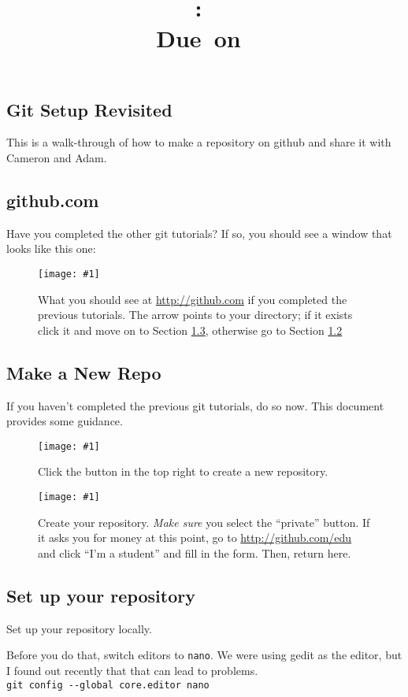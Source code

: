 \documentclass{article}
\title{\vspace{2in}\textmd{\textbf{\hmwkClass:\ \hmwkTitle}}\\\normalsize\vspace{0.1in}\small{Due\ on\ \hmwkDueDate}\\\vspace{0.1in}\large{}\vspace{3in}}
\date{}
\def\Figure#1#2#3#4#5{
\begin{figure}[htp]
\texttt{[image: \#1]}
\caption{#2}
\label{#3}
\end{figure}
}
\begin{document}
\begin{spacing}{0.5}
\newpage



\section{Git Setup Revisited}

This is a walk-through of how to make a repository on github and share
it with Cameron and Adam.

\subsection{github.com}
Have you completed the other git tutorials?  If so, you should see
a window that looks like this one:

\Figure{Frame1_yourdir.png}
{What you should see at \url{http://github.com} if you completed
the previous tutorials.  The arrow points to your directory;
if it exists click it and move on to Section \ref{sec:setup}, otherwise
go to Section \ref{sec:makenew}}
{fig:yourdir}{0.5}{0}

\clearpage
\subsection{Make a New Repo}
\label{sec:makenew}
If you haven't completed the previous git tutorials, do so now.
This document provides some guidance.

\Figure{MakeNewRepo.png}
{Click the button in the top right to create a new repository.}
{fig:makenew}{0.5}{0}

\Figure{CreateRepository.png}
{Create your repository. \emph{Make sure} you select the ``private'' button.
If it asks you for money at this point, go to \url{http://github.com/edu}
and click ``I'm a student'' and fill in the form.  Then, return here.}
{fig:create}{0.5}{0}

\clearpage
\subsection{Set up your repository}
\label{sec:setup}
Set up your repository locally.

Before you do that, switch editors to \verb|nano|.  We were using gedit
as the editor, but I found out recently that that can lead to problems.\\
\verb|git config --global core.editor nano|


\end{spacing}
\end{document}
